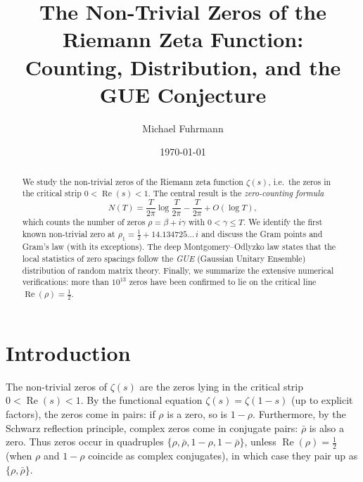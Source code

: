 \documentclass[12pt,a4paper]{amsart}
\theoremstyle{definition}
\DeclareMathOperator{\Re}{Re}
\begin{document}

\title{The Non-Trivial Zeros of the Riemann Zeta Function:\\
       Counting, Distribution, and the GUE Conjecture}

\author{Michael Fuhrmann}
\address{Specialist Mathematics Project, Build 84}
\date{\today}

\begin{abstract}
We study the non-trivial zeros of the Riemann zeta function $\zeta(s)$,
i.e.\ the zeros in the critical strip $0 < \Re(s) < 1$.
The central result is the \emph{zero-counting formula}
\[
  N(T) = \frac{T}{2\pi}\log\frac{T}{2\pi} - \frac{T}{2\pi} + O(\log T),
\]
which counts the number of zeros $\rho = \beta + i\gamma$ with
$0 < \gamma \le T$.
We identify the first known non-trivial zero at
$\rho_1 = \tfrac{1}{2} + 14.134725\ldots\,i$ and discuss
the Gram points and Gram's law (with its exceptions).
The deep Montgomery--Odlyzko law states that the local statistics of
zero spacings follow the \emph{GUE} (Gaussian Unitary Ensemble)
distribution of random matrix theory.
Finally, we summarize the extensive numerical verifications: more than
$10^{13}$ zeros have been confirmed to lie on the critical line $\Re(\rho)=\tfrac{1}{2}$.
\end{abstract}

\maketitle
\tableofcontents

\section{Introduction}

The non-trivial zeros of $\zeta(s)$ are the zeros lying in the critical
strip $0 < \Re(s) < 1$.  By the functional equation $\zeta(s) = \zeta(1-s)$
(up to explicit factors), the zeros come in pairs: if $\rho$ is a zero,
so is $1 - \rho$.  Furthermore, by the Schwarz reflection principle,
complex zeros come in conjugate pairs: $\bar\rho$ is also a zero.
Thus zeros occur in quadruples $\{\rho, \bar\rho, 1-\rho, 1-\bar\rho\}$,
unless $\Re(\rho) = \tfrac{1}{2}$ (when $\rho$ and $1-\rho$ coincide as
complex conjugates), in which case they pair up as $\{\rho, \bar\rho\}$.
\end{document}
